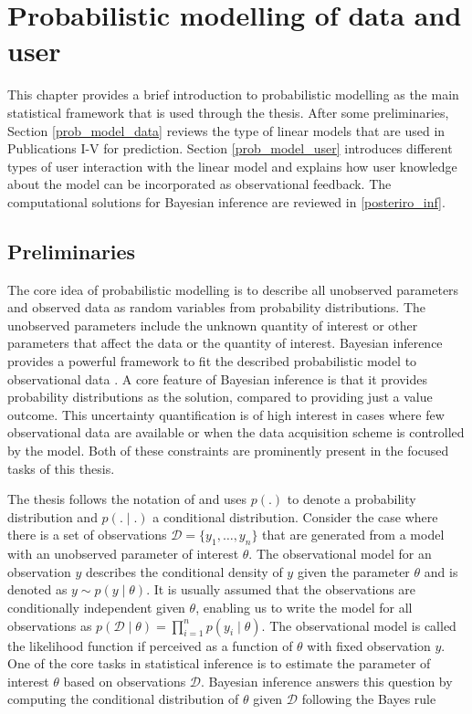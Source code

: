 \documentclass[dissertation,math,vertlayout,pdfa,colorlinks]{aaltoseries}
\newcommand{\bD}{\mathcal{D}}
\begin{document}
\chapter{Probabilistic modelling of data and user} \label{prob_model_data_user}


This chapter provides a brief introduction to probabilistic modelling as the main statistical framework that is used through the thesis. After some preliminaries,  Section \ref{prob_model_data} reviews the type of linear models that are used in Publications I-V for prediction. Section \ref{prob_model_user} introduces different types of user interaction with the linear model and explains how user knowledge about the model can be incorporated as observational feedback. The computational solutions for Bayesian inference are reviewed in \ref{posteriro_inf}. %

\section{Preliminaries}
The core idea of probabilistic modelling is to describe all unobserved parameters and observed data as random variables from probability distributions. The unobserved parameters include the unknown quantity of interest or other parameters that affect the data or the quantity of interest. Bayesian inference provides a powerful framework to fit the described probabilistic model to observational data \cite{Gelman2013}. A core feature of Bayesian inference is that it provides probability distributions as the solution, compared to providing just a value outcome. %
This uncertainty quantification is of high interest in cases where few observational data are available or when the data acquisition scheme is controlled by the model. Both of these constraints are prominently present in the focused tasks of this thesis.

The thesis follows the notation of \cite{Gelman2013} and uses $p(.)$ to denote a probability distribution and $p(.\mid.)$ a conditional distribution. Consider the case where there is a set of observations $\bD= \{y_1,\ldots,y_n\}$ that are generated from a model with an unobserved parameter of interest $\theta$. The observational model for an observation $y$ describes the conditional density of $y$ given the parameter $\theta$ and is denoted as $y \sim p(y \mid \theta)$. It is usually assumed that the observations are conditionally independent given $\theta$, enabling us to write the model for all observations as $p(\bD \mid \theta) =  \prod_{i=1}^{n} p(y_i \mid \theta)$. The observational model is called the likelihood function if perceived as a function of $\theta$ with fixed observation $y$. One of the core tasks in statistical inference is to estimate the parameter of interest $\theta$ based on observations $\bD$. %
Bayesian inference answers this question by computing the conditional distribution of $\theta$ given $\bD$ following the Bayes rule
\end{document}
